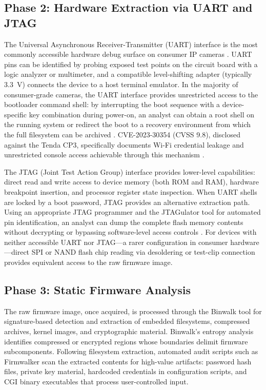 \documentclass[letterpaper, 10pt, conference]{ieeeconf}
\begin{document}
\subsection{Phase 2: Hardware Extraction via UART and JTAG}

The Universal Asynchronous Receiver-Transmitter (UART) interface
is the most commonly accessible hardware debug surface on consumer
IP cameras \cite{charmanas2023}. UART pins can be identified by
probing exposed test points on the circuit board with a logic analyzer
or multimeter, and a compatible level-shifting adapter (typically
3.3~V) connects the device to a host terminal emulator. In the
majority of consumer-grade cameras, the UART interface provides
unrestricted access to the bootloader command shell: by interrupting
the boot sequence with a device-specific key combination during
power-on, an analyst can obtain a root shell on the running system
or redirect the boot to a recovery environment from which the full
filesystem can be archived \cite{charmanas2023, kaspersky2022}.
CVE-2023-30354 (CVSS 9.8), disclosed against the Tenda CP3, specifically
documents Wi-Fi credential leakage and unrestricted console access
achievable through this mechanism \cite{stabili2024}.

The JTAG (Joint Test Action Group) interface provides lower-level
capabilities: direct read and write access to device memory (both
ROM and RAM), hardware breakpoint insertion, and processor register
state inspection. When UART shells are locked by a boot password,
JTAG provides an alternative extraction path. Using an appropriate
JTAG programmer and the JTAGulator tool for automated pin
identification, an analyst can dump the complete flash memory
contents without decrypting or bypassing software-level access
controls \cite{charmanas2023}. For devices with neither accessible
UART nor JTAG---a rarer configuration in consumer hardware---direct
SPI or NAND flash chip reading via desoldering or test-clip connection
provides equivalent access to the raw firmware image.

\subsection{Phase 3: Static Firmware Analysis}

The raw firmware image, once acquired, is processed through the
Binwalk tool for signature-based detection and extraction of embedded
filesystems, compressed archives, kernel images, and cryptographic
material. Binwalk's entropy analysis identifies compressed or encrypted
regions whose boundaries delimit firmware subcomponents. Following
filesystem extraction, automated audit scripts such as Firmwalker
scan the extracted contents for high-value artifacts: password hash
files, private key material, hardcoded credentials in configuration
scripts, and CGI binary executables that process user-controlled input.
\end{document}

